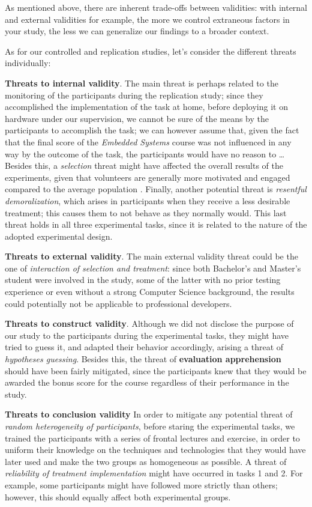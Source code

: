 As mentioned above, there are inherent trade-offs between validities: with internal and external validities for example, the more we control extraneous factors in your study, the less we can generalize our findings to a broader context.


As for our controlled and replication studies, let's consider the different threats individually:

\noindent\textbf{Threats to internal validity}.
The main threat is perhaps related to the monitoring of the participants during the replication study; since they accomplished the implementation of the task at home, before deploying it on hardware under our supervision, we cannot be sure of the means by the participants to accomplish the task; we can however assume that, given the fact that the final score of the \textit{Embedded Systems} course was not influenced in any way by the outcome of the task, the participants would have no reason to \dots
Besides this, a \textit{selection} threat might have affected the overall results of the experiments, given that volunteers are generally more motivated and engaged compared to the average population \cite{DBLP:books/sp/WohlinRHOR00}. Finally, another potential threat is \textit{resentful demoralization}, which arises in participants when they receive a less desirable treatment; this causes them to not behave as they normally would. This last threat holds in all three experimental tasks, since it is related to the nature of the adopted experimental design.

\noindent\textbf{Threats to external validity}.
The main external validity threat could be the one of \textit{interaction of selection and treatment}: since both Bachelor's and Master's student were involved in the study, some of the latter with no prior testing experience or even without a strong Computer Science background, the results could potentially not be applicable to professional developers. 

\noindent\textbf{Threats to construct validity}.
Although we did not disclose the purpose of our study to the participants during the experimental tasks, they might have tried to guess it, and adapted their behavior accordingly, arising a threat of \textit{hypotheses guessing}. Besides this, the threat of \textbf{evaluation apprehension} should have been fairly mitigated, since the participants knew that they would be awarded the bonus score for the course regardless of their performance in the study.

\noindent\textbf{Threats to conclusion validity}
In order to mitigate any potential threat of \textit{random heterogeneity of participants}, before staring the experimental tasks, we trained the participants with a series of frontal lectures and exercise, in order to uniform their knowledge on the techniques and technologies that they would have later used and make the two groups as homogeneous as possible. A threat of \textit{reliability of treatment implementation} might have occurred in tasks 1 and 2. For example, some participants might have followed \tdd more strictly than others; however, this should equally affect both experimental groups.